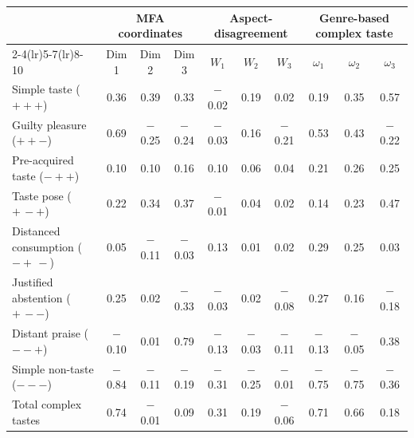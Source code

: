 \footnotesize
\setlength{\tabcolsep}{2pt}
\begin{tabular}{lccccccccc}
\toprule
 & \multicolumn{3}{c}{MFA coordinates} & \multicolumn{3}{c}{Aspect-disagreement} & \multicolumn{3}{c}{Genre-based complex taste} \\
\cmidrule(lr){2-4}\cmidrule(lr){5-7}\cmidrule(lr){8-10}
 & Dim 1 & Dim 2 & Dim 3 & $W_1$ & $W_2$ & $W_3$ & $\omega_1$ & $\omega_2$ & $\omega_3$ \\
\midrule
Simple taste ($+++$) & 0.36 & 0.39 & 0.33 & $-$0.02 & 0.19 & 0.02 & 0.19 & 0.35 & 0.57 \\
Guilty pleasure ($++-$) & 0.69 & $-$0.25 & $-$0.24 & $-$0.03 & 0.16 & $-$0.21 & 0.53 & 0.43 & $-$0.22 \\
Pre-acquired taste ($-++$) & 0.10 & 0.10 & 0.16 & 0.10 & 0.06 & 0.04 & 0.21 & 0.26 & 0.25 \\
Taste pose ($+\,-+$) & 0.22 & 0.34 & 0.37 & $-$0.01 & 0.04 & 0.02 & 0.14 & 0.23 & 0.47 \\
Distanced consumption ($-+\,-$) & 0.05 & $-$0.11 & $-$0.03 & 0.13 & 0.01 & 0.02 & 0.29 & 0.25 & 0.03 \\
Justified abstention ($+\,--$) & 0.25 & 0.02 & $-$0.33 & $-$0.03 & 0.02 & $-$0.08 & 0.27 & 0.16 & $-$0.18 \\
Distant praise ($--+$) & $-$0.10 & 0.01 & 0.79 & $-$0.13 & $-$0.03 & $-$0.11 & $-$0.13 & $-$0.05 & 0.38 \\
Simple non-taste ($---$) & $-$0.84 & $-$0.11 & $-$0.19 & $-$0.31 & $-$0.25 & $-$0.01 & $-$0.75 & $-$0.75 & $-$0.36 \\
Total complex tastes & 0.74 & $-$0.01 & 0.09 & 0.31 & 0.19 & $-$0.06 & 0.71 & 0.66 & 0.18 \\
\bottomrule
\end{tabular}
